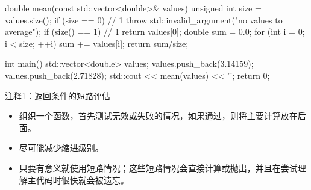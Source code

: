 
\begin{cpp}
double mean(const std::vector<double>& values) {
  unsigned int size = values.size();
  if (size == 0) // 1
    throw std::invalid_argument("no values to average");
  if (size() == 1) // 1
    return values[0];
  double sum = 0.0;
  for (int i = 0; i < size; ++i)
    sum += values[i];
  return sum/size;
}

int main() {
  std::vector<double> values;
  values.push_back(3.14159);
  values.push_back(2.71828);
  std::cout << mean(values) << '\n';
  return 0;
}
\end{cpp}

{\footnotesize
注释1：返回条件的短路评估
}


\begin{itemize}
\item
组织一个函数，首先测试无效或失败的情况，如果通过，则将主要计算放在后面。

\item
尽可能减少缩进级别。

\item
只要有意义就使用短路情况；这些短路情况会直接计算或抛出，并且在尝试理解主代码时很快就会被遗忘。
\end{itemize}







